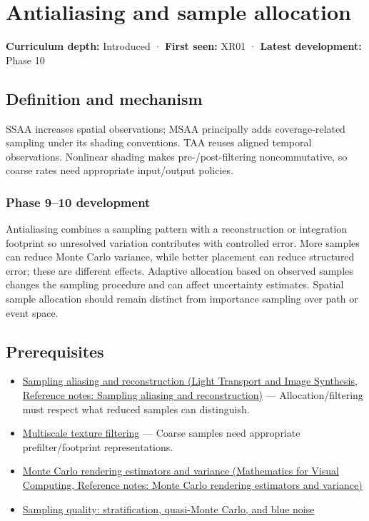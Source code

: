 \hypertarget{appendix-4192b2bdd21e}{}\label{referencestart:appendix-4192b2bdd21e}
\section{Antialiasing and sample allocation}\label{appendix-4192b2bdd21e-antialiasing-and-sample-allocation}

\textbf{Curriculum depth:} Introduced · \textbf{First seen:} XR01 · \textbf{Latest development:} Phase 10

\subsection{Definition and mechanism}\label{appendix-4192b2bdd21e-definition-and-mechanism}

SSAA increases spatial observations; MSAA principally adds coverage-related sampling under its shading conventions. TAA reuses aligned temporal observations. Nonlinear shading makes pre-/post-filtering noncommutative, so coarse rates need appropriate input/output policies.

\subsubsection{Phase 9--10 development}\label{appendix-4192b2bdd21e-phase-910-development}

Antialiasing combines a sampling pattern with a reconstruction or integration footprint so unresolved variation contributes with controlled error. More samples can reduce Monte Carlo variance, while better placement can reduce structured error; these are different effects. Adaptive allocation based on observed samples changes the sampling procedure and can affect uncertainty estimates. Spatial sample allocation should remain distinct from importance sampling over path or event space.

\subsection{Prerequisites}\label{appendix-4192b2bdd21e-prerequisites}

\begin{itemize}
\tightlist
\item
  \href{../04-Light-Transport-and-Image-Synthesis/main.pdf\#nameddest=appendix-6a7869dd79a6}{Sampling aliasing and reconstruction (Light Transport and Image Synthesis, Reference notes: Sampling aliasing and reconstruction)} --- Allocation/filtering must respect what reduced samples can distinguish.
\item
  \hyperref[appendix-b677a85ba76f]{Multiscale texture filtering} --- Coarse samples need appropriate prefilter/footprint representations.
\item
  \href{../02-Mathematics-for-Visual-Computing/main.pdf\#nameddest=appendix-031e02bf28af}{Monte Carlo rendering estimators and variance (Mathematics for Visual Computing, Reference notes: Monte Carlo rendering estimators and variance)}
\item
  \hyperref[appendix-9f693ffd82bc]{Sampling quality: stratification, quasi-Monte Carlo, and blue noise}
\end{itemize}

